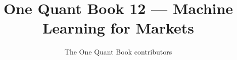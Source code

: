 \documentclass[11pt,a4paper,twoside,openany]{book}
\title{One Quant Book 12 --- Machine Learning for Markets}
\author{The One Quant Book contributors}
\date{\bookdate}
\begin{document}
\frontmatter



\tableofcontents

\mainmatter


\appendix
\part{\omsolutionspart}


\backmatter
\printindex
\end{document}
